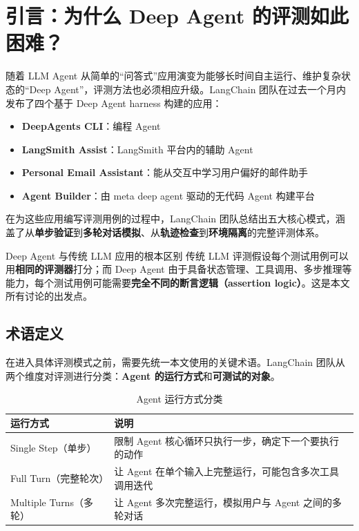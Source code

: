 \section{引言：为什么 Deep Agent 的评测如此困难？}

随着 LLM Agent 从简单的``问答式''应用演变为能够长时间自主运行、维护复杂状态的``Deep Agent''，评测方法也必须相应升级。LangChain 团队在过去一个月内发布了四个基于 Deep Agent harness 构建的应用：

\begin{itemize}
  \item \textbf{DeepAgents CLI}：编程 Agent
  \item \textbf{LangSmith Assist}：LangSmith 平台内的辅助 Agent
  \item \textbf{Personal Email Assistant}：能从交互中学习用户偏好的邮件助手
  \item \textbf{Agent Builder}：由 meta deep agent 驱动的无代码 Agent 构建平台
\end{itemize}

在为这些应用编写评测用例的过程中，LangChain 团队总结出五大核心模式，涵盖了从\textbf{单步验证}到\textbf{多轮对话模拟}、从\textbf{轨迹检查}到\textbf{环境隔离}的完整评测体系。

\begin{importantbox}{Deep Agent 与传统 LLM 应用的根本区别}
传统 LLM 评测假设每个测试用例可以用\textbf{相同的评测器}打分；而 Deep Agent 由于具备状态管理、工具调用、多步推理等能力，每个测试用例可能需要\textbf{完全不同的断言逻辑（assertion logic）}。这是本文所有讨论的出发点。
\end{importantbox}

\subsection{术语定义}

在进入具体评测模式之前，需要先统一本文使用的关键术语。LangChain 团队从两个维度对评测进行分类：\textbf{Agent 的运行方式}和\textbf{可测试的对象}。

\begin{table}[H]
\centering
\caption{Agent 运行方式分类}
\begin{tabular}{lp{10cm}}
\toprule
\textbf{运行方式} & \textbf{说明} \\
\midrule
Single Step（单步） & 限制 Agent 核心循环只执行一步，确定下一个要执行的动作 \\
Full Turn（完整轮次） & 让 Agent 在单个输入上完整运行，可能包含多次工具调用迭代 \\
Multiple Turns（多轮） & 让 Agent 多次完整运行，模拟用户与 Agent 之间的多轮对话 \\
\bottomrule
\end{tabular}
\end{table}

